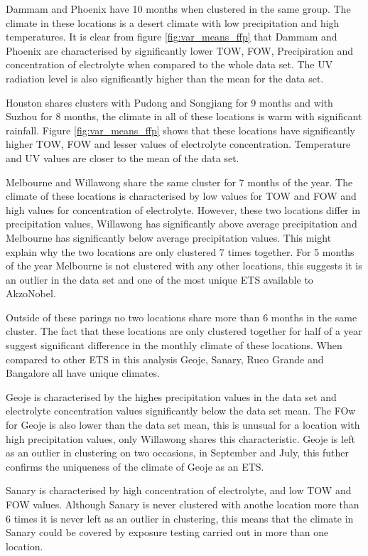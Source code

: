 \documentclass{article}
\begin{document}
Dammam and Phoenix have 10 months when clustered in the same group. The climate in these locations is a desert climate with low precipitation and high temperatures. It is clear from figure \ref{fig:var_means_ffp} that Dammam and Phoenix are characterised by significantly lower TOW, FOW, Precipiration and concentration of electrolyte when compared to the whole data set. The UV radiation level is also significantly higher than the mean for the data set.     

Houston shares clusters with Pudong and Songjiang for 9 months and with Suzhou for 8 months, the climate in all of these locations is warm  with significant rainfall. Figure \ref{fig:var_means_ffp} shows that these locations have significantly higher TOW, FOW and lesser values of electrolyte concentration. Temperature and UV values are closer to the mean of the data set.  

Melbourne and Willawong share the same cluster for 7 months of the year. The climate of these locations is characterised by low values for TOW and FOW and high values for concentration of electrolyte. However, these two locations differ in precipitation values, Willawong has significantly above average precipitation and Melbourne has significantly below average precipitation values. This might explain why the two locations are only clustered 7 times together. For 5 months of the year Melbourne is not clustered with any other locations, this suggests it is an outlier in the data set and one of the most unique ETS available to AkzoNobel.

Outside of these parings no two locations share more than 6 months in the same cluster. The fact that these locations are only clustered together for half of a year suggest significant difference in the monthly climate of these locations. When compared to other ETS in this analysis Geoje, Sanary, Ruco Grande and Bangalore all have unique climates. 

Geoje is characterised by the highes precipitation values in the data set and electrolyte concentration values significantly below the data set mean. The FOw for Geoje is also lower than the data set mean, this is unusual for a location with high precipitation values, only Willawong shares this characteristic. Geoje is left as an outlier in clustering on two occasions, in September and July, this futher confirms the uniqueness of the climate of Geoje as an ETS. 

Sanary is characterised by high concentration of electrolyte, and low TOW and FOW values. Although Sanary is never clustered with anothe location more than 6 times it is never left as an outlier in clustering, this means that the climate in Sanary could be covered by exposure testing carried out in more than one location.
\end{document}
